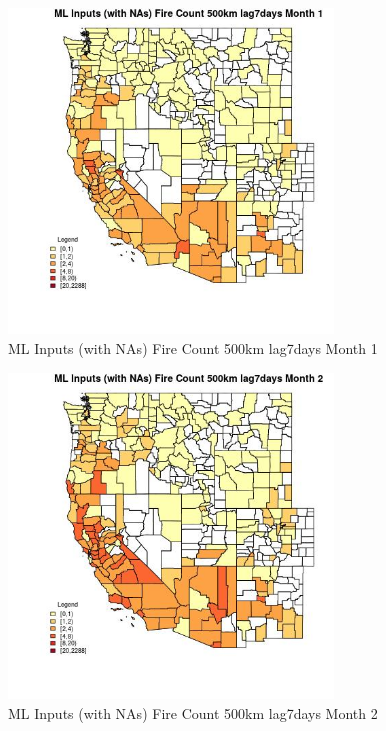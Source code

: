 \begin{figure} 
\centering  
\includegraphics[width=0.77\textwidth]{Code_Outputs/Report_ML_input_PM25_Step4_part_e_de_duplicated_aves_compiled_2019-05-20wNAs_CountyFire_Count_500km_lag7daysmedianMonth1.jpg} 
\caption{\label{fig:Report_ML_input_PM25_Step4_part_e_de_duplicated_aves_compiled_2019-05-20wNAsCountyFire_Count_500km_lag7daysmedianMonth1}ML Inputs (with NAs) Fire Count 500km lag7days Month 1} 
\end{figure} 
 

\begin{figure} 
\centering  
\includegraphics[width=0.77\textwidth]{Code_Outputs/Report_ML_input_PM25_Step4_part_e_de_duplicated_aves_compiled_2019-05-20wNAs_CountyFire_Count_500km_lag7daysmedianMonth2.jpg} 
\caption{\label{fig:Report_ML_input_PM25_Step4_part_e_de_duplicated_aves_compiled_2019-05-20wNAsCountyFire_Count_500km_lag7daysmedianMonth2}ML Inputs (with NAs) Fire Count 500km lag7days Month 2} 
\end{figure} 
 

